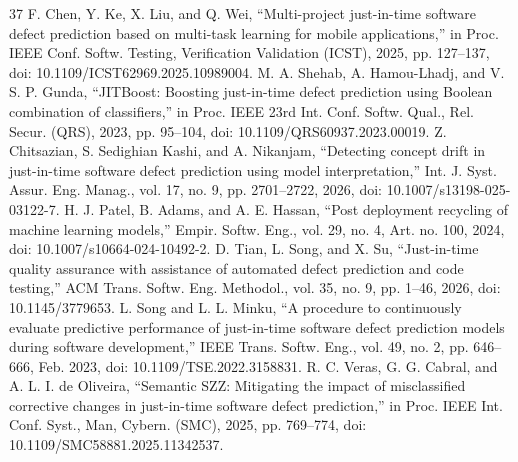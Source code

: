 \begin{thebibliography}{37}
 F. Chen, Y. Ke, X. Liu, and Q. Wei, ``Multi-project just-in-time software defect prediction based on multi-task learning for mobile applications,'' in Proc. IEEE Conf. Softw. Testing, Verification Validation (ICST), 2025, pp. 127--137, doi: \mbox{10.1109/ICST62969.2025.10989004}.
 M. A. Shehab, A. Hamou-Lhadj, and V. S. P. Gunda, ``JITBoost: Boosting just-in-time defect prediction using Boolean combination of classifiers,'' in Proc. IEEE 23rd Int. Conf. Softw. Qual., Rel. Secur. (QRS), 2023, pp. 95--104, doi: \mbox{10.1109/QRS60937.2023.00019}.
 Z. Chitsazian, S. Sedighian Kashi, and A. Nikanjam, ``Detecting concept drift in just-in-time software defect prediction using model interpretation,'' Int. J. Syst. Assur. Eng. Manag., vol. 17, no. 9, pp. 2701--2722, 2026, doi: \mbox{10.1007/s13198-025-03122-7}.
 H. J. Patel, B. Adams, and A. E. Hassan, ``Post deployment recycling of machine learning models,'' Empir. Softw. Eng., vol. 29, no. 4, Art. no. 100, 2024, doi: \mbox{10.1007/s10664-024-10492-2}.
 D. Tian, L. Song, and X. Su, ``Just-in-time quality assurance with assistance of automated defect prediction and code testing,'' ACM Trans. Softw. Eng. Methodol., vol. 35, no. 9, pp. 1--46, 2026, doi: \mbox{10.1145/3779653}.
 L. Song and L. L. Minku, ``A procedure to continuously evaluate predictive performance of just-in-time software defect prediction models during software development,'' IEEE Trans. Softw. Eng., vol. 49, no. 2, pp. 646--666, Feb. 2023, doi: \mbox{10.1109/TSE.2022.3158831}.
 R. C. Veras, G. G. Cabral, and A. L. I. de Oliveira, ``Semantic SZZ: Mitigating the impact of misclassified corrective changes in just-in-time software defect prediction,'' in Proc. IEEE Int. Conf. Syst., Man, Cybern. (SMC), 2025, pp. 769--774, doi: \mbox{10.1109/SMC58881.2025.11342537}.
\end{thebibliography}
